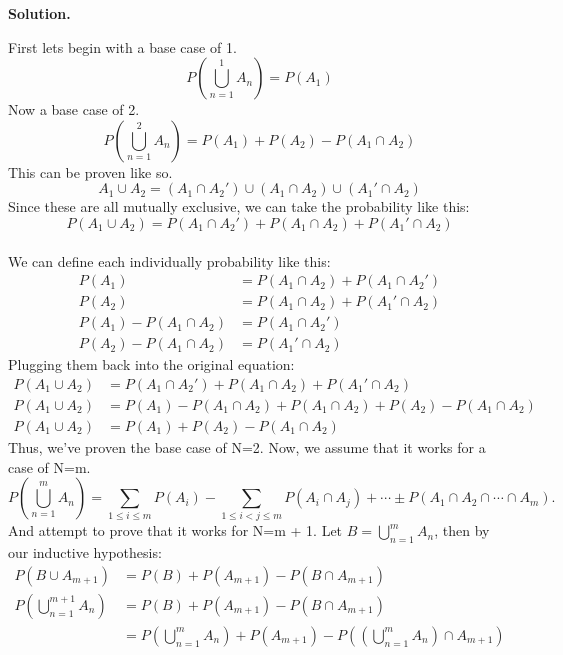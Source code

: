 \documentclass[11pt]{article}
\newenvironment{solution}{\par\noindent\textbf{Solution.}\ }{\par\vspace{6pt}}
\begin{document}
    \begin{solution}

        First lets begin with a base case of 1.
        \[P\left(\bigcup_{n=1}^{1} A_n\right) = P(A_1)\]
        Now a base case of 2.
        \[P\left(\bigcup_{n=1}^{2} A_n\right) = P(A_1) + P(A_2) - P(A_1 \cap A_2)\]
        This can be proven like so.
        \[A_1 \cup A_2 = (A_1 \cap A_2') \cup (A_1 \cap A_2) \cup (A_1' \cap A_2)\]
        Since these are all mutually exclusive, we can take the probability like this:
        \[P(A_1 \cup A_2) = P(A_1 \cap A_2') + P(A_1 \cap A_2) + P(A_1' \cap A_2)\] \\
        We can define each individually probability like this:
        \begin{align}
            P(A_1) &= P(A_1 \cap A_2) + P(A_1 \cap A_2') \\
            P(A_2) &= P(A_1 \cap A_2) + P(A_1' \cap A_2) \\
            P(A_1) - P(A_1 \cap A_2) &= P(A_1 \cap A_2') \\
            P(A_2) - P(A_1 \cap A_2) &= P(A_1' \cap A_2)
        \end{align}
        Plugging them back into the original equation:
        \begin{align}
            P(A_1 \cup A_2) &= P(A_1 \cap A_2') + P(A_1 \cap A_2) + P(A_1' \cap A_2) \\
            P(A_1 \cup A_2) &= P(A_1) - P(A_1 \cap A_2) + P(A_1 \cap A_2) + P(A_2) - P(A_1 \cap A_2) \\
            P(A_1 \cup A_2) &= P(A_1) + P(A_2) - P(A_1 \cap A_2)
        \end{align}
        Thus, we've proven the base case of N=2.
        Now, we assume that it works for a case of N=m.
        \[
            P\left(\bigcup_{n=1}^{m} A_n\right) = \sum_{1 \le i \le m} P(A_i) - \sum_{1 \le i < j \le m} P(A_i \cap A_j) + \cdots \pm P(A_1 \cap A_2 \cap \cdots \cap A_m).
        \]
        And attempt to prove that it works for N=m + 1.
        Let $B = \bigcup_{n=1}^{m} A_n$, then by our inductive hypothesis:
        \begin{align}
            P(B \cup A_{m + 1}) &= P(B) + P(A_{m + 1}) - P(B \cap A_{m + 1}) \\
            P\left(\bigcup_{n=1}^{m+1} A_n\right) &= P(B) + P(A_{m + 1}) - P(B \cap A_{m + 1}) \\
            &= P\left(\bigcup_{n=1}^{m} A_n\right) + P(A_{m + 1}) - P\left(\left(\bigcup_{n=1}^{m} A_n\right) \cap A_{m + 1}\right) \\

\end{align}
\end{solution}
\end{document}
